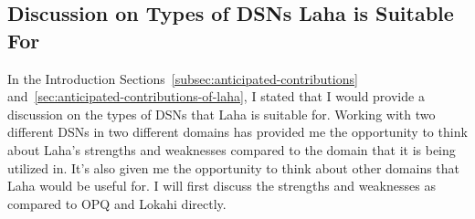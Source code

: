%
%
%
%
%

\subsection{Discussion on Types of DSNs Laha is Suitable For}\label{subsec:discussion-on-types-of-dsns-laha-is-suitable-for}

In the Introduction Sections~\ref{subsec:anticipated-contributions} and~\ref{sec:anticipated-contributions-of-laha}, I stated that I would provide a discussion on the types of DSNs that Laha is suitable for. Working with two different DSNs in two different domains has provided me the opportunity to think about Laha's strengths and weaknesses compared to the domain that it is being utilized in. It's also given me the opportunity to think about other domains that Laha would be useful for. I will first discuss the strengths and weaknesses as compared to OPQ and Lokahi directly.

